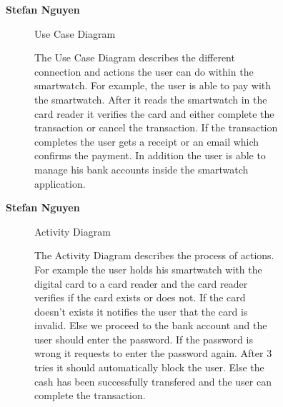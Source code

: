 \documentclass{article}
\begin{document}
	\begin{figure}[htbp]
		\textbf{Stefan Nguyen}
		\centering
		\begin{subfigure}{\textwidth}
			\resizebox{\textwidth}{!}{}
			\caption{Use Case Diagram}
		\end{subfigure}
		\begin{subfigure}{\textwidth}
			The Use Case Diagram describes the different connection and actions the user can do within the smartwatch. For example, 
			the user is able to pay with the smartwatch. After it reads the smartwatch in the card reader it verifies the card and 
			either complete the transaction or cancel the transaction. If the transaction completes the user gets a receipt or an 
			email which confirms the payment. In addition the user is able to manage his bank accounts inside the smartwatch application. 
		\end{subfigure}
	\end{figure}


	\begin{figure}[htbp]
		\textbf{Stefan Nguyen}
		\centering
		\begin{subfigure}{\textwidth}
			\resizebox{\textwidth}{!}{}
			\caption{Activity Diagram}
		\end{subfigure}
		\begin{subfigure}{\textwidth}
			The Activity Diagram describes the process of actions. For example the user holds his smartwatch with the digital card
			to a card reader and the card reader verifies if the card exists or does not. If the card doesn't exists it notifies
			the user that the card is invalid. Else we proceed to the bank account and the user should enter the password. If the 
			password is wrong it requests to enter the password again. After 3 tries it should automatically block the user. Else the 
			cash has been successfully transfered and the user can complete the transaction. 
		\end{subfigure}
	\end{figure}
\end{document}
